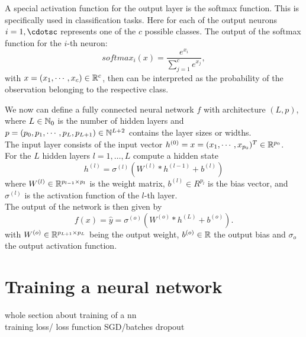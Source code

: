 \begin{definition}
A special activation function for the output layer is the softmax function. This is specifically used in classification tasks. Here for each of the output neurons $i=1,\cdotsc$ represents one of the $c$ possible classes. The output of the softmax function for the $i$-th neuron:
$$softmax_i(x)= \frac{e^{x_i}}{\sum_{j=1}^{c}e^{x_j}},$$
with $x=(x_1,\cdots,x_{c})\in \mathbb{R}^{c}$, then can be interpreted as the probability of the observation belonging to the respective class.
\end{definition}

\begin{definition}
    We now can define a fully connected neural network $f$ with architecture $(L,p)$, where $L\in \mathbb{N}_0$ is the number of hidden layers and $p=(p_0,p_1,\cdots, p_L, p_{L+1}) \in\mathbb{N}^{L+2}$ contains the layer sizes or widths.\\
    The input layer consists of the input vector $h^{(0)} = x = (x_1,\cdots, x_{p_0})^T\in\mathbb{R}^{p_0}$. \\
    For the $L$ hidden layers $l=1,\dots, L$ compute a hidden state
    $$h^{(l)}=\sigma^{(l)}( W^{(l)} * h^{(l-1)} + b^{(l)})$$
    where $W^{(l)}\in \mathbb{R}^{p_{l-1}\times p_l}$ is the weight matrix, $b^{(l)}\in R^{p_l}$ is the bias vector, and $\sigma^{(l)}$ is the activation function of the $l$-th layer.\\
    The output of the network is then given by 
    $$f(x)=\hat{y}= \sigma^{(o)}( W^{(o)} * h^{(L)}+b^{(o)}).$$
    with $W^{(o)}\in\mathbb{R}^{p_{L+1} \times p_L}$ being the output weight, $b^{(o)}\in\mathbb{R}$ the output bias and $\sigma_o$ the output activation function.
\end{definition}

\section{Training a neural network}
\color{red} whole section about training of a nn\\
training loss/ loss function 
SGD/batches
dropout
\color{black}

